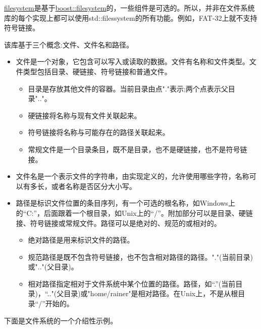 
\href{http://en.cppreference.com/w/cpp/filesystem}{filesystem}是基于\href{http://www.boost.org/doc/libs/1_65_1/libs/filesystem/doc/index.htm}{boost::filesystem}的，一些组件是可选的。所以，并非在文件系统库的每个实现上都可以使用std::filessystem的所有功能。例如，FAT-32上就不支持符号链接。

该库基于三个概念:文件、文件名和路径。

\begin{itemize}
\item 
文件是一个对象，它包含可以写入或读取的数据。文件有名称和文件类型。文件类型包括目录、硬链接、符号链接和普通文件。

\begin{itemize}
\item 
目录是存放其他文件的容器。当前目录由点"."表示;两个点表示父目录".."。

\item 
硬链接将名称与现有文件关联起来。

\item 
符号链接将名称与可能存在的路径关联起来。

\item 
常规文件是一个目录条目，既不是目录，也不是硬链接，也不是符号链接。
\end{itemize}

\item 
文件名是一个表示文件的字符串，由实现定义的，允许使用哪些字符，名称可以有多长，或者名称是否区分大小写。

\item 
路径是标识文件位置的条目序列，有一个可选的根名称，如Windows上的“C:”，后面跟着一个根目录，如Unix上的“/”。附加部分可以是目录、硬链接、符号链接或常规文件。路径可以是绝对的、规范的或相对的。

\begin{itemize}
\item 
绝对路径是用来标识文件的路径。

\item 
规范路径是既不包含符号链接，也不包含相对路径的路径。"."(当前目录)或".."(父目录)。

\item 
相对路径指定相对于文件系统中某个位置的路径。路径，如“.”(当前目录)，“.."(父目录)或"home/rainer"是相对路径。在Unix上，不是从根目录“/”开始的。
\end{itemize}
\end{itemize}

下面是文件系统的一个介绍性示例。

